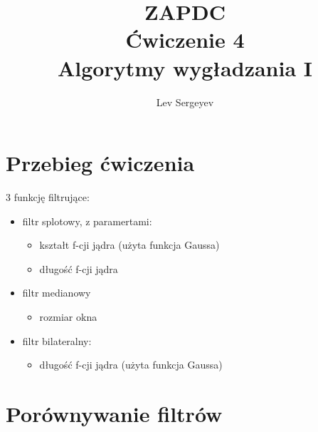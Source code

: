 \documentclass{article}
\author{Lev Sergeyev}
\title{ZAPDC \\ Ćwiczenie 4 \\ Algorytmy wygładzania I}
\date{ }
\begin{document}
\maketitle


\section{Przebieg ćwiczenia}
3 funkcję filtrujące:
\begin{itemize} 
	\item filtr splotowy, z paramertami:
	\begin{itemize} 
		\item kształt f-cji jądra (użyta funkcja Gaussa)
		\item długość f-cji jądra
	\end{itemize}
	\item filtr medianowy
	\begin{itemize} 
		\item rozmiar okna
	\end{itemize}
	\item filtr bilateralny:
	\begin{itemize} 
		\item długość f-cji jądra (użyta funkcja Gaussa)
	\end{itemize}
\end{itemize}

\section{Porównywanie filtrów}
\end{document}
